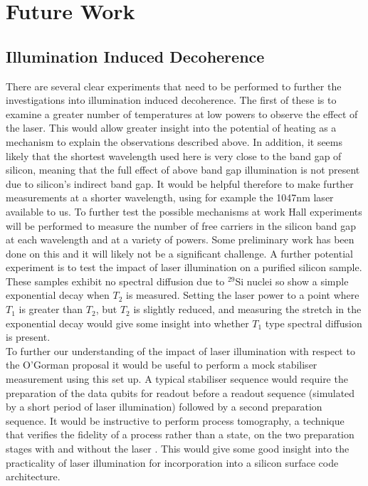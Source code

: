 \chapter{Future Work}


\section{Illumination Induced Decoherence}

There are several clear experiments that need to be performed to further the investigations into illumination induced decoherence.
The first of these is to examine a greater number of temperatures at low powers to observe the effect of the laser.
This would allow greater insight into the potential of heating as a mechanism to explain the observations described above.
In addition, it seems likely that the shortest wavelength used here is very close to the band gap of silicon, meaning that the full effect of above band gap illumination is not present due to silicon's indirect band gap.
It would be helpful therefore to make further measurements at a shorter wavelength, using for example the 1047nm laser available to us.
To further test the possible mechanisms at work Hall experiments will be performed to measure the number of free carriers in the silicon band gap at each wavelength and at a variety of powers.
Some preliminary work has been done on this and it will likely not be a significant challenge.
A further potential experiment is to test the impact of laser illumination on a purified silicon sample.
These samples exhibit no spectral diffusion due to $^{29}$Si nuclei so show a simple exponential decay when $T_2$ is measured.
Setting the laser power to a point where $T_1$ is greater than $T_2$, but $T_2$ is slightly reduced, and measuring the stretch in the exponential decay would give some insight into whether $T_1$ type spectral diffusion is present.
\\
To further our understanding of the impact of laser illumination with respect to the O'Gorman proposal it would be useful to perform a mock stabiliser measurement using this set up.
A typical stabiliser sequence would require the preparation of the data qubits for readout before a readout sequence (simulated by a short period of laser illumination) followed by a second preparation sequence.
It would be instructive to perform process tomography, a technique that verifies the fidelity of a process rather than a state, on the two preparation stages with and without the laser \cite{Nielsen:2011:QCQ:1972505}.
This would give some good insight into the practicality of laser illumination for incorporation into a silicon surface code architecture.

